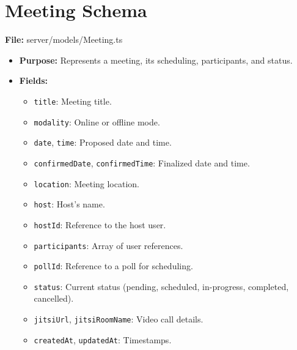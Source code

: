 \documentclass{article}
\begin{document}
\section*{Meeting Schema}
\textbf{File:} server/models/Meeting.ts

\begin{itemize}[leftmargin=*]
  \item \textbf{Purpose:} Represents a meeting, its scheduling, participants, and status.
  \item \textbf{Fields:}
    \begin{itemize}
      \item \texttt{title}: Meeting title.
      \item \texttt{modality}: Online or offline mode.
      \item \texttt{date}, \texttt{time}: Proposed date and time.
      \item \texttt{confirmedDate}, \texttt{confirmedTime}: Finalized date and time.
      \item \texttt{location}: Meeting location.
      \item \texttt{host}: Host's name.
      \item \texttt{hostId}: Reference to the host user.
      \item \texttt{participants}: Array of user references.
      \item \texttt{pollId}: Reference to a poll for scheduling.
      \item \texttt{status}: Current status (pending, scheduled, in-progress, completed, cancelled).
      \item \texttt{jitsiUrl}, \texttt{jitsiRoomName}: Video call details.
      \item \texttt{createdAt}, \texttt{updatedAt}: Timestamps.
    \end{itemize}
\end{itemize}
\end{document}
